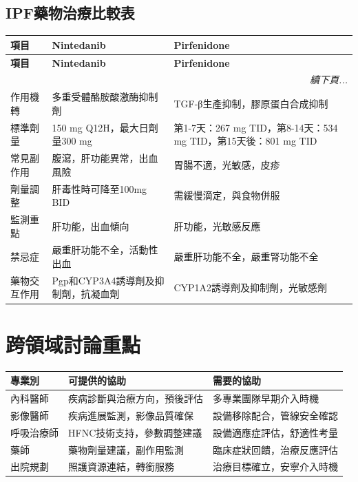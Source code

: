 \documentclass{article}
\begin{document}
\subsection{IPF藥物治療比較表}
\begin{longtable}{p{4cm} p{5cm} p{5cm}}
\toprule
\textbf{項目} & \textbf{Nintedanib} & \textbf{Pirfenidone} \\
\midrule
\endfirsthead
\toprule
\textbf{項目} & \textbf{Nintedanib} & \textbf{Pirfenidone} \\
\midrule
\endhead
\midrule
\multicolumn{3}{r}{\textit{續下頁...}} \\
\endfoot
\bottomrule
\endlastfoot

作用機轉 & 多重受體酪胺酸激酶抑制劑 & TGF-β生產抑制，膠原蛋白合成抑制 \\
標準劑量 & 150 mg Q12H，最大日劑量300 mg & 第1-7天：267 mg TID，第8-14天：534 mg TID，第15天後：801 mg TID \\
常見副作用 & 腹瀉，肝功能異常，出血風險 & 胃腸不適，光敏感，皮疹 \\
劑量調整 & 肝毒性時可降至100mg BID & 需緩慢滴定，與食物併服 \\
監測重點 & 肝功能，出血傾向 & 肝功能，光敏感反應 \\
禁忌症 & 嚴重肝功能不全，活動性出血 & 嚴重肝功能不全，嚴重腎功能不全 \\
藥物交互作用 & Pgp和CYP3A4誘導劑及抑制劑，抗凝血劑 & CYP1A2誘導劑及抑制劑，光敏感劑 \\
\end{longtable}

\section{跨領域討論重點}

\begin{longtable}{p{3cm} p{6cm} p{6cm}}
\toprule
\textbf{專業別} & \textbf{可提供的協助} & \textbf{需要的協助} \\
\midrule
內科醫師 & 疾病診斷與治療方向，預後評估 & 多專業團隊早期介入時機 \\
影像醫師 & 疾病進展監測，影像品質確保 & 設備移除配合，管線安全確認 \\
呼吸治療師 & HFNC技術支持，參數調整建議 & 設備適應症評估，舒適性考量 \\
藥師 & 藥物劑量建議，副作用監測 & 臨床症狀回饋，治療反應評估 \\
出院規劃 & 照護資源連結，轉銜服務 & 治療目標確立，安寧介入時機 \\
\bottomrule
\end{longtable}
\end{document}
